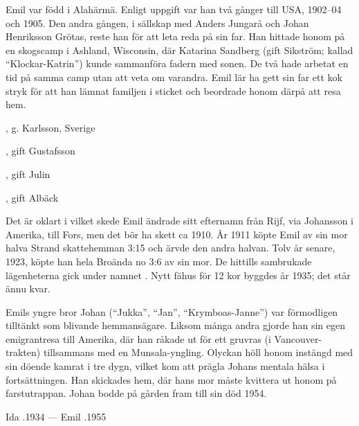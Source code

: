 Emil var född i Alahärmä. Enligt uppgift var han två gånger till USA, 1902--04 och 1905. Den andra gången, i sällskap med Anders Jungarå och Johan Henriksson Grötas, reste han för att leta reda på sin far. Han hittade honom på en skogscamp i Ashland, Wisconsin, där Katarina Sandberg (gift Sikström; kallad ``Klockar-Katrin'') kunde sammanföra fadern med	sonen. De två hade arbetat en tid på samma camp utan att veta om varandra. Emil lär ha gett sin far ett kok stryk för att han lämnat familjen i sticket och beordrade honom därpå att resa hem.
\begin{jhchildren}
  \item {}, g. Karlsson, Sverige
  \item {}, gift Gustafsson
  \item {}, gift Julin
  \item {}
  \item {}, gift Albäck
\end{jhchildren}
Det är oklart i vilket skede Emil ändrade sitt efternamn från Rijf, via Johansson i Amerika, till Fors, men det bör ha skett ca 1910. År 1911 köpte Emil av sin mor halva Strand skattehemman 3:15 och ärvde den andra halvan. Tolv år senare, 1923, köpte han hela Broända no 3:6 av sin mor. De hittills sambrukade lägenheterna gick under namnet . Nytt fähus för 12 kor byggdes år 1935; det står ännu kvar.

Emils yngre bror Johan (``Jukka'', ``Jan'', ``Krymboas-Janne'') var	förmodligen tilltänkt som blivande hemmansägare. Liksom många andra gjorde han sin egen emigrantresa till Amerika, där han råkade ut för ett gruvras (i Vancouver-trakten) tillsammans med en Munsala-yngling. Olyckan höll honom instängd med sin döende kamrat i tre dygn, vilket kom att prägla Johans mentala hälsa i fortsättningen. Han skickades hem, där hans mor måste kvittera ut honom på farstutrappan. Johan bodde på gården fram till sin död 1954.

Ida .1934  ---	 Emil .1955


